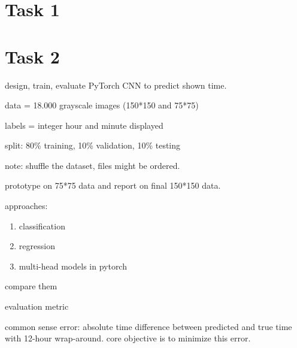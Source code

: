 \documentclass{article}
\begin{document}
\section{Task 1}

\section{Task 2}

design, train, evaluate PyTorch CNN to predict shown time.

data = 18.000 grayscale images (150*150 and 75*75)

labels = integer hour and minute displayed

split: 80\% training, 10\% validation, 10\% testing

note: shuffle the dataset, files might be ordered.

prototype on 75*75 data and report on final 150*150 data.

approaches:
\begin{enumerate}
\item classification
\item regression
\item multi-head models in pytorch
\end{enumerate}

compare them

evaluation metric

common sense error: absolute time difference between predicted and true time with 12-hour wrap-around. core objective is to minimize this error.
\end{document}
